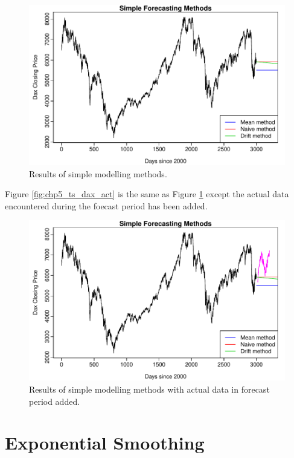 \begin{figure}[tbh]
\centering
\includegraphics{Figures/chp_ts_dax1}
\caption[Results of simple modelling methods.]{Results of simple modelling methods.}
\label{fig:chp5_ts_dax}
\end{figure}

Figure \ref{fig:chp5_ts_dax_act} is the same as Figure \ref{fig:chp5_ts_dax} except the actual data encountered during the foecast period has been added.

\begin{figure}[tbh]
\centering
\includegraphics{Figures/chp_ts_dax1_plus_act_data}
\caption[Results of simple modelling methods and actual data.]{Results of simple modelling methods with actual data in forecast period added.}
\label{fig:chp_ts_dax_act}
\end{figure}

\section{Exponential Smoothing}

